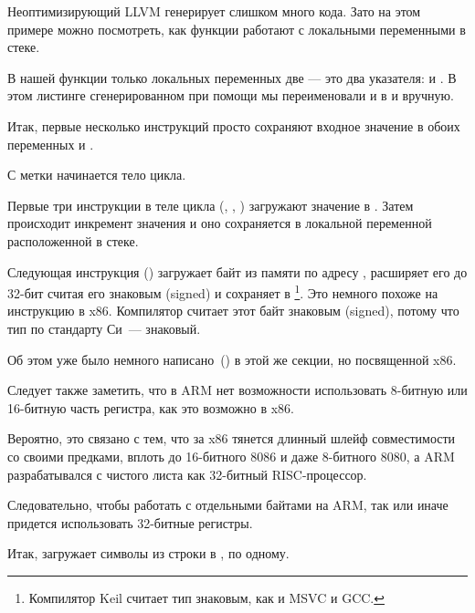 ﻿

\mysubparagraph{\NonOptimizingXcodeIV (\ARMMode)}



Неоптимизирующий LLVM генерирует слишком много кода. Зато на этом примере можно посмотреть, 
как функции работают с локальными переменными в стеке.

В нашей функции только локальных переменных две --- это два указателя:
 и .
В этом листинге сгенерированном при помощи \IDA мы переименовали  и  в  и  вручную.%

Итак, первые несколько инструкций просто сохраняют входное значение в обоих переменных  и .

С метки  начинается тело цикла.

Первые три инструкции в теле цикла (, \ADD, ) 
загружают значение  в . 
Затем происходит инкремент значения и оно сохраняется в локальной переменной  расположенной 
в стеке.

Следующая инструкция  () 
загружает байт из памяти по адресу , расширяет его до 32-бит считая его знаковым (signed) 
и сохраняет в 
\footnote{Компилятор Keil считает тип \Tchar знаковым, как и MSVC и GCC.}.
Это немного похоже на инструкцию \MOVSX в x86.
Компилятор считает этот байт знаковым (signed), потому что тип \Tchar по стандарту Си~--- знаковый.

Об этом уже было немного написано~() в этой же секции, но посвященной x86.

Следует также заметить, что в ARM нет возможности использовать 8-битную или 16-битную часть 
регистра, как это возможно в x86.

Вероятно, это связано с тем, что за x86 тянется длинный шлейф совместимости со своими предками, 
вплоть до 16-битного 8086 и даже 8-битного 8080, 
а ARM разрабатывался с чистого листа как 32-битный RISC-процессор.

Следовательно, чтобы работать с отдельными байтами на ARM, так или иначе придется использовать 
32-битные регистры.

Итак,  загружает символы из строки в , по одному.

